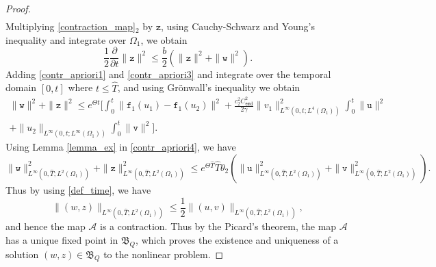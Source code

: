 \documentclass[11pt]{article}
\begin{document}
\begin{proof}
\begin{multline}
\end{multline}
Multiplying \eqref{contraction_map}$_2$ by $\mathtt{z}$, using Cauchy-Schwarz and Young's inequality and integrate over $\Omega_1$, we obtain
\begin{equation}\label{contr_apriori3}
\frac{1}{2}\frac{\partial}{\partial t}\parallel \mathtt{z}\parallel^2   \leq \frac{b}{2} \left( \parallel \mathtt{z}\parallel^2 + \parallel \mathtt{w}\parallel^2 \right).
\end{equation} 
Adding \eqref{contr_apriori1} and \eqref{contr_apriori3} and integrate over the temporal domain $[0, t]$ where $t\leq \widehat{T}$, and using Gr\"{o}nwall's inequality we obtain 
\begin{multline}\label{contr_apriori4}
\parallel \mathtt{w}\parallel^2 + \parallel \mathtt{z}\parallel^2 \leq e^{\Theta t} \big[\int_0^t \parallel \mathtt{f}_1(u_1) -\mathtt{f}_1(u_2)\parallel^2  + \frac{c_2^2 C_{\texttt{emd}}^2}{2\gamma}\parallel v_1\parallel_{L^{\infty}(0,t;L^{4}(\Omega_1))}^2 \int_0^t \parallel \mathtt{u}\parallel^2 \\ + \parallel u_2\parallel_{L^{\infty}(0,t;L^{\infty}(\Omega_1))} \int_0^t \parallel \mathtt{v}\parallel^2\big].
\end{multline}
Using Lemma \ref{lemma_ex} in \eqref{contr_apriori4}, we have 
\begin{equation}\label{contr_apriori5}
\parallel \mathtt{w}\parallel^2_{L^{\infty}(0,\widehat{T}; L^2(\Omega_1))} + \parallel \mathtt{z}\parallel^2_{L^{\infty}(0,\widehat{T}; L^2(\Omega_1))} \leq 
e^{\Theta \widehat{T}} \widehat{T} \theta_2 \left( \parallel \mathtt{u}\parallel^2_{L^{\infty}(0,\widehat{T}; L^2(\Omega_1))} + \parallel \mathtt{v}\parallel^2_{L^{\infty}(0,\widehat{T}; L^2(\Omega_1))} \right).
\end{equation}
Thus by using \eqref{def_time}, we have 
\begin{equation}
\parallel (w, z)\parallel_{L^{\infty}(0,\widehat{T};L^{2}(\Omega_1))} \leq \frac{1}{2} \parallel (u, v)\parallel_{L^{\infty}(0,\widehat{T};L^{2}(\Omega_1))},
\end{equation}
and hence the map $\mathcal{A}$ is a contraction. Thus by the Picard's theorem, the map $\mathcal{A}$ has a unique fixed point in $\mathfrak{B}_Q$, which proves
the existence and uniqueness of a solution $(w, z)\in\mathfrak{B}_Q$ to the nonlinear problem.
\end{proof}
\end{document}
